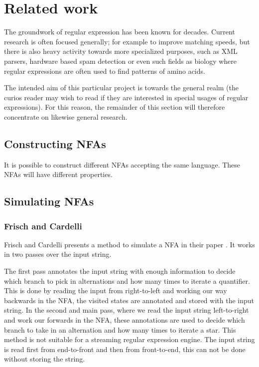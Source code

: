 \section{Related work}
\label{sec:related}

The groundwork of regular expression has been known for
decades. Current research is often focused generally; for
example to improve matching speeds, but there is also heavy activity
towards more specialized purposes, such as XML parsers, hardware based spam
detection or even such fields as biology where regular expressions are
often used to find patterns of amino acids. 

The intended aim of this particular project is towards the general
realm (the curios reader may wish to read \cite{pedersen2010} if they
are interested in special usages of regular expressions). For this
reason, the remainder of this section will therefore concentrate on
likewise general research.



\subsection{Constructing NFAs}

It is possible to construct different NFAs accepting the same
language. These NFAs will have different properties. 


\subsection{Simulating NFAs}

\subsubsection{Frisch and Cardelli}

Frisch and Cardelli presents a method to simulate a NFA in their paper
\cite{2004:GreedyRegularExpressionMatching}. It works in two passes
over the input string. 

The first pass annotates the input string with
enough information to decide which branch to pick in alternations and
how many times to iterate a quantifier. This is done by reading the
input from right-to-left and working our way backwards in the NFA, the
visited states are annotated and stored with the input string. In the
second and main pass, where we read the input string left-to-right and
work our forwards in the NFA, these annotations are used to decide
which branch to take in an alternation and how many times to iterate a
star. This method is not suitable for a streaming regular expression
engine. The input string is read first from end-to-front and then from
front-to-end, this can not be done without storing the string.

